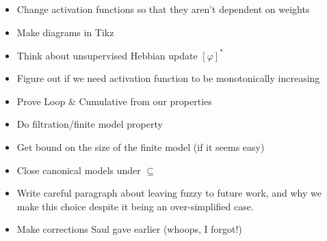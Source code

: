 \documentclass{article}
\begin{document}
\begin{itemize}
  \item Change activation functions so that they aren't dependent on weights
  
  \item Make diagrams in Tikz
  
  \item Think about unsupervised Hebbian update $[\varphi]^{\ast}$
  
  \item Figure out if we need activation function to be monotonically
  increasing
  
  \item Prove Loop \& Cumulative from our properties
  
  \item Do filtration/finite model property
  
  \item Get bound on the size of the finite model (if it seems easy)
  
  \item Close canonical models under $\subseteq$
  
  \item Write careful paragraph about leaving fuzzy to future work, and why we
  make this choice despite it being an over-simplified case.
  
  \item Make corrections Saul gave earlier (whoops, I forgot!)
\end{itemize}
\end{document}
